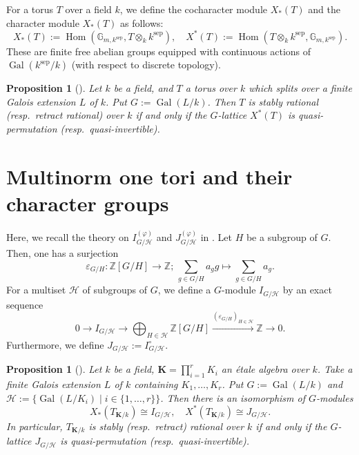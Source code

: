\documentclass[12pt]{amsart}
\theoremstyle{plain}
\newtheorem{prop}[thm]{Proposition}
\theoremstyle{definition}
\numberwithin{thm}{section}
\numberwithin{equation}{section}
\newcommand{\Z}{\mathbb{Z}}
\newcommand{\G}{\mathbb{G}}
\newcommand{\bK}{\mathbf{K}}
\newcommand{\cH}{\mathcal{H}}
\DeclareMathOperator{\Hom}{Hom}
\DeclareMathOperator{\Gal}{Gal}
\DeclareMathOperator{\sep}{sep}
\begin{document}
For a torus $T$ over a field $k$, we define the cocharacter module $X_{*}(T)$ and the character module $X_{*}(T)$ as follows: 
\begin{equation*}
X_{*}(T):=\Hom(\G_{m,k^{\sep}},T\otimes_{k}k^{\sep}),\quad 
X^{*}(T):=\Hom(T\otimes_{k}k^{\sep},\G_{m,k^{\sep}}). 
\end{equation*}
These are finite free abelian groups equipped with continuous actions of $\Gal(k^{\sep}/k)$ (with respect to discrete topology).

\begin{prop}[{\cite[Proposition 9.5.3, Proposition 9.5.4]{Lorenz2005}}]\label{prop:rtiv}
Let $k$ be a field, and $T$ a torus over $k$ which splits over a finite Galois extension $L$ of $k$. Put $G:=\Gal(L/k)$. Then $T$ is stably rational (resp.~retract rational) over $k$ if and only if the $G$-lattice $X^{*}(T)$ is quasi-permutation (resp.~quasi-invertible). 
\end{prop}

\section{Multinorm one tori and their character groups}\label{sect:mnot}

Here, we recall the theory on $I_{G/\cH}^{(\varphi)}$ and $J_{G/\cH}^{(\varphi)}$ in \cite[\S 3]{Hasegawa}. Let $H$ be a subgroup of $G$. Then, one has a surjection
\begin{equation*}
    \varepsilon_{G/H}\colon \Z[G/H]\rightarrow \Z;\,\sum_{g\in G/H}a_{g}g\mapsto \sum_{g\in G/H}a_{g}. 
\end{equation*}
For a multiset $\cH$ of subgroups of $G$, we define a $G$-module $I_{G/\cH}$ by an exact sequence
\begin{equation*}
    0\rightarrow I_{G/\cH}\rightarrow \bigoplus_{H\in \cH}\Z[G/H]\xrightarrow{(\varepsilon_{G/H})_{H\in \cH}} \Z \rightarrow 0. 
\end{equation*}
Furthermore, we define $J_{G/\cH}:=I_{G/\cH}^{\circ}$. 

\begin{prop}[{\cite[Proposition 3.1]{Hasegawa}}]\label{prop:coch}
Let $k$ be a field, $\bK=\prod_{i=1}^{r}K_{i}$ an {\'e}tale algebra over $k$. Take a finite Galois extension $L$ of $k$ containing $K_{1},\ldots,K_{r}$. Put $G:=\Gal(L/k)$ and $\cH:=\{\Gal(L/K_{i})\mid i\in \{1,\ldots,r\}\}$. Then there is an isomorphism of $G$-modules
\begin{equation*}
    X_{*}(T_{\bK/k})\cong I_{G/\cH},\quad X^{*}(T_{\bK/k})\cong J_{G/\cH}. 
\end{equation*}
In particular, $T_{\bK/k}$ is stably (resp.~retract) rational over $k$ if and only if the $G$-lattice $J_{G/\cH}$ is quasi-permutation (resp.~quasi-invertible). 
\end{prop}
\end{document}
